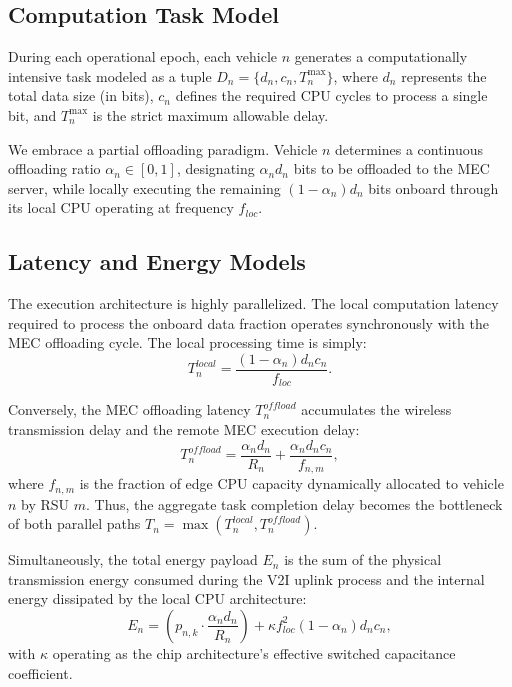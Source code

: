 \subsection{Computation Task Model}
During each operational epoch, each vehicle $n$ generates a computationally intensive task modeled as a tuple $D_n = \{d_n, c_n, T^{\max}_n\}$, where $d_n$ represents the total data size (in bits), $c_n$ defines the required CPU cycles to process a single bit, and $T^{\max}_n$ is the strict maximum allowable delay. 

We embrace a partial offloading paradigm. Vehicle $n$ determines a continuous offloading ratio $\alpha_n \in [0, 1]$, designating $\alpha_n d_n$ bits to be offloaded to the MEC server, while locally executing the remaining $(1 - \alpha_n) d_n$ bits onboard through its local CPU operating at frequency $f_{loc}$. 

\subsection{Latency and Energy Models}
The execution architecture is highly parallelized. The local computation latency required to process the onboard data fraction operates synchronously with the MEC offloading cycle. The local processing time is simply:
\begin{equation}
    T_n^{local} = \frac{(1 - \alpha_n) d_n c_n}{f_{loc}}.
\end{equation}

Conversely, the MEC offloading latency $T_n^{offload}$ accumulates the wireless transmission delay and the remote MEC execution delay:
\begin{equation}
    T_n^{offload} = \frac{\alpha_n d_n}{R_n} + \frac{\alpha_n d_n c_n}{f_{n,m}},
\end{equation}
where $f_{n,m}$ is the fraction of edge CPU capacity dynamically allocated to vehicle $n$ by RSU $m$. Thus, the aggregate task completion delay becomes the bottleneck of both parallel paths $T_n = \max(T_n^{local}, T_n^{offload})$.

Simultaneously, the total energy payload $E_n$ is the sum of the physical transmission energy consumed during the V2I uplink process and the internal energy dissipated by the local CPU architecture:
\begin{equation}
    E_n = \left( p_{n,k} \cdot \frac{\alpha_n d_n}{R_n} \right) + \kappa f_{loc}^2 (1 - \alpha_n) d_n c_n,
\end{equation}
with $\kappa$ operating as the chip architecture's effective switched capacitance coefficient.

